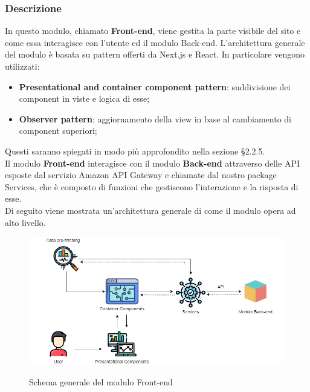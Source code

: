 \subsubsection{Descrizione}

In questo modulo, chiamato \textbf{Front-end}, viene gestita la parte visibile del sito \nameproject{} e come essa interagisce con l'utente ed il modulo Back-end. L'architettura generale del modulo è basata su pattern offerti da Next.js e React. In particolare vengono utilizzati:
\begin{itemize}
	\item \textbf{Presentational and container component pattern}: suddivisione dei component in viste e logica di esse;
	\item \textbf{Observer pattern}: aggiornamento della view in base al cambiamento di component superiori;
\end{itemize} 
Questi saranno spiegati in modo più approfondito nella sezione \S{2.2.5}.\\
Il modulo \textbf{Front-end} interagisce con il modulo \textbf{Back-end} attraverso delle API esposte dal servizio Amazon API Gateway e chiamate dal nostro package Services, che è composto di funzioni che gestiscono l'interazione e la risposta di esse. \\
Di seguito viene mostrata un'architettura generale di come il modulo opera ad alto livello.

\vspace{1cm}

\begin{figure}[H]
\centering
\includegraphics[scale=0.50]{res/Architettura/Frontend/img/general_frontend}\\
\caption{Schema generale del modulo Front-end}
\end{figure}